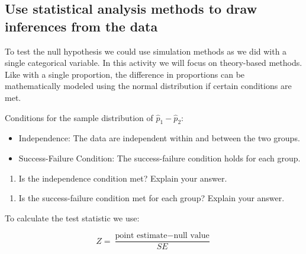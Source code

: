 \documentclass[
]{report}
\providecommand{\tightlist}{%
  \setlength{\itemsep}{0pt}\setlength{\parskip}{0pt}}
\begin{document}
\vspace{0.5in}
\newpage

\hypertarget{use-statistical-analysis-methods-to-draw-inferences-from-the-data}{%
\subsection*{Use statistical analysis methods to draw inferences from the data}\label{use-statistical-analysis-methods-to-draw-inferences-from-the-data}}

To test the null hypothesis we could use simulation methods as we did with a single categorical variable. In this activity we will focus on theory-based methods. Like with a single proportion, the difference in proportions can be mathematically modeled using the normal distribution if certain conditions are met.

Conditions for the sample distribution of \(\hat{p}_1-\hat{p}_2\):

\begin{itemize}
\item
  Independence: The data are independent within and between the two groups.
\item
  Success-Failure Condition: The success-failure condition holds for each group.
\end{itemize}

\vspace{.25in}

\begin{enumerate}
\def\labelenumi{\arabic{enumi}.}
\setcounter{enumi}{15}
\tightlist
\item
  Is the independence condition met? Explain your answer.
\end{enumerate}

\vspace{1in}

\begin{enumerate}
\def\labelenumi{\arabic{enumi}.}
\setcounter{enumi}{16}
\tightlist
\item
  Is the success-failure condition met for each group? Explain your answer.
\end{enumerate}

\vspace{1in}

To calculate the test statistic we use:

\[
Z = \frac{\text{point estimate} - \text{null value}}{SE}
\]
\end{document}
